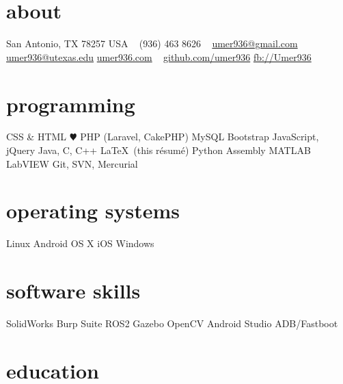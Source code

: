 \documentclass[]{friggeri-cv} %
\begin{document}


\begin{aside} %
	\section{about}
	San Antonio, TX 78257
	USA
	~
	(936) 463 8626
	~
	\href{mailto:umer936@gmail.com}{umer936@gmail.com}
	\href{mailto:umer936@utexas.edu}{umer936@utexas.edu}
	\href{http://umer936.com}{umer936.com}
	~
	\href{http://github.com/umer936}{github.com/umer936}
	\href{http://facebook.com/Umer936}{fb://Umer936}
	~
	\section{programming}
	CSS \& HTML
	{\color{red} $\varheartsuit$} PHP (Laravel, CakePHP)
	MySQL
	Bootstrap
	JavaScript, jQuery
	Java, C, C++
	\LaTeX \ (this r\'esum\'e)
	Python
	Assembly
	MATLAB
	LabVIEW
	Git, SVN, Mercurial
	~
	\section{operating systems}
	Linux
	Android
	OS X
	iOS
	Windows
	~
	\section{software skills}
	SolidWorks
	Burp Suite
	ROS2
	Gazebo
	OpenCV
	Android Studio
	ADB/Fastboot
\end{aside}


\section{education}
\vspace{-10pt}
\end{document}

